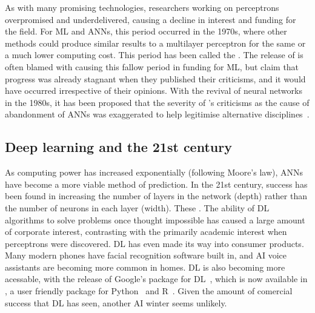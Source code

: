 As with many promising technologies, researchers working on perceptrons overpromised and underdelivered, causing a decline in interest and funding for the field.
For ML and \acp{ANN}, this period occurred in the 1970s, where other methods could produce similar results to a multilayer perceptron for the same or a much lower computing cost.
This period has been called the .
The release of  is often blamed with causing this fallow period in funding for ML, but \citeauthor{minsky1987} claim that progress was already stagnant when they published their criticisms, and it would have occurred irrespective of their opinions.
With the revival of neural networks in the 1980s, it has been proposed that the severity of \citeauthor{minsky1987}'s criticisms as the cause of abandonment of \acp{ANN} was exaggerated to help legitimise alternative disciplines~\autocite[649]{olazaran1996}.

\subsection{Deep learning and the 21st century} \label{deeplearning}

As computing power has increased exponentially (following Moore's law), \acp{ANN} have become a more viable method of prediction.
In the 21st century, success has been found in increasing the number of layers in the network (depth) rather than the number of neurons in each layer (width).
These  .
The ability of \ac{DL} algorithms to solve problems once thought impossible has caused a large amount of corporate interest, contrasting with the primarily academic interest when perceptrons were discovered.
\ac{DL} has even made its way into consumer products.
Many modern phones have facial recognition software built in, and \ac{AI} voice assistants are becoming more common in homes.
\ac{DL} is also becoming more acessable, with the release of Google's  package for \ac{DL}~\autocite{abadi2016}, which is now available in , a user friendly package for Python~\autocite{chollet2015} and R~\autocite{allaire2018}.
Given the amount of comercial success that \ac{DL} has seen, another AI winter seems unlikely.
